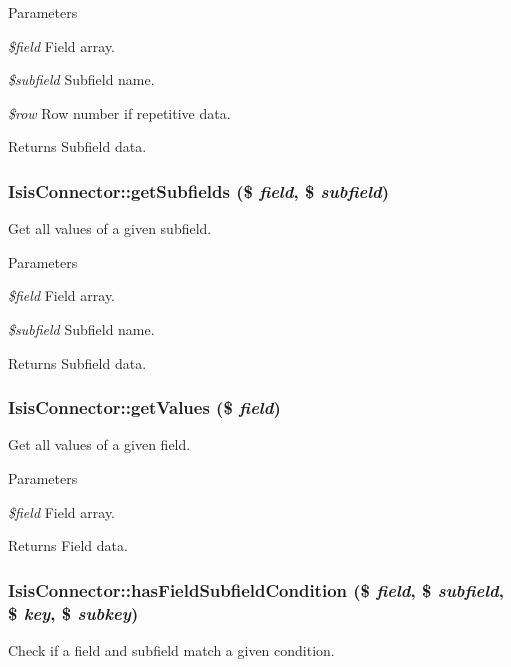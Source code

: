 \begin{DoxyParams}{Parameters}
\item[{\em \$field}]Field array.\item[{\em \$subfield}]Subfield name.\item[{\em \$row}]Row number if repetitive data.\end{DoxyParams}
\begin{DoxyReturn}{Returns}
Subfield data. 
\end{DoxyReturn}
\hypertarget{classIsisConnector_ad8af0f5cef3b139649d9fb317264df10}{
\subsubsection[{getSubfields}]{\setlength{\rightskip}{0pt plus 5cm}IsisConnector::getSubfields (\$ {\em field}, \/  \$ {\em subfield})}}
\label{classIsisConnector_ad8af0f5cef3b139649d9fb317264df10}
Get all values of a given subfield.


\begin{DoxyParams}{Parameters}
\item[{\em \$field}]Field array.\item[{\em \$subfield}]Subfield name.\end{DoxyParams}
\begin{DoxyReturn}{Returns}
Subfield data. 
\end{DoxyReturn}
\hypertarget{classIsisConnector_ad806dcc5be703fe9aea63d72d68af0a2}{
\subsubsection[{getValues}]{\setlength{\rightskip}{0pt plus 5cm}IsisConnector::getValues (\$ {\em field})}}
\label{classIsisConnector_ad806dcc5be703fe9aea63d72d68af0a2}
Get all values of a given field.


\begin{DoxyParams}{Parameters}
\item[{\em \$field}]Field array.\end{DoxyParams}
\begin{DoxyReturn}{Returns}
Field data. 
\end{DoxyReturn}
\hypertarget{classIsisConnector_afbcef48a723b073a2777d5a5ed73d280}{
\subsubsection[{hasFieldSubfieldCondition}]{\setlength{\rightskip}{0pt plus 5cm}IsisConnector::hasFieldSubfieldCondition (\$ {\em field}, \/  \$ {\em subfield}, \/  \$ {\em key}, \/  \$ {\em subkey})}}
\label{classIsisConnector_afbcef48a723b073a2777d5a5ed73d280}
Check if a field and subfield match a given condition.


